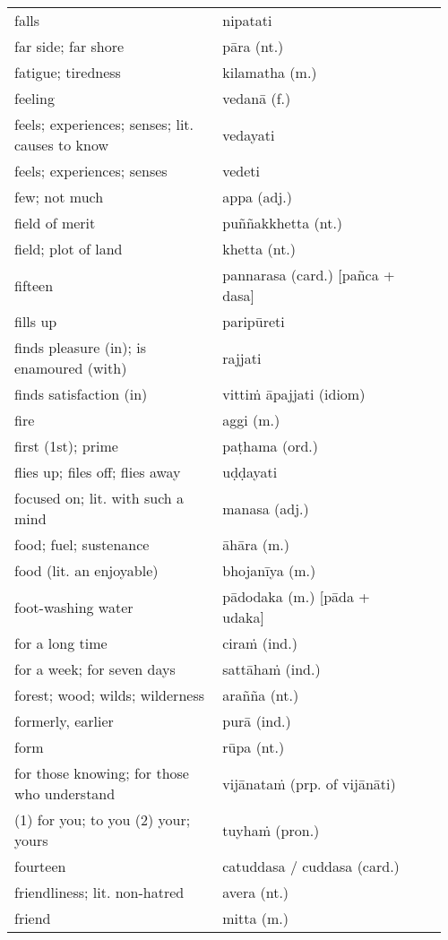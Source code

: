 \documentclass[a5paper]{memoir}
\begin{document}
\begin{longtable}{L{0.48\linewidth} L{0.48\linewidth} H}
falls & nipatati & \\[0pt]
far side; far shore & pāra (nt.) & \\[0pt]
fatigue; tiredness & kilamatha (m.) & \\[0pt]
feeling & vedanā (f.) & \\[0pt]
feels; experiences; senses; lit. causes to know & vedayati & \\[0pt]
feels; experiences; senses & vedeti & \\[0pt]
few; not much & appa (adj.) & \\[0pt]
field of merit & puññakkhetta (nt.) & \\[0pt]
field; plot of land & khetta (nt.) & \\[0pt]
fifteen & pannarasa (card.) [pañca + dasa] & \\[0pt]
fills up & paripūreti & \\[0pt]
finds pleasure (in); is enamoured (with) & rajjati & \\[0pt]
finds satisfaction (in) & vittiṁ āpajjati (idiom) & \\[0pt]
fire & aggi (m.) & \\[0pt]
first (1st); prime & paṭhama (ord.) & \\[0pt]
flies up; files off; flies away & uḍḍayati & \\[0pt]
focused on; lit. with such a mind & manasa (adj.) & \\[0pt]
food; fuel; sustenance & āhāra (m.) & \\[0pt]
food (lit. an enjoyable) & bhojanīya (m.) & \\[0pt]
foot-washing water & pādodaka (m.) [pāda + udaka] & \\[0pt]
for a long time & ciraṁ (ind.) & \\[0pt]
for a week; for seven days & sattāhaṁ (ind.) & \\[0pt]
forest; wood; wilds; wilderness & arañña (nt.) & \\[0pt]
formerly, earlier & purā (ind.) & \\[0pt]
form & rūpa (nt.) & \\[0pt]
for those knowing; for those who understand & vijānataṁ (prp. of vijānāti) & \\[0pt]
(1) for you; to you (2) your; yours & tuyhaṁ (pron.) & \\[0pt]
fourteen & catuddasa / cuddasa (card.) & \\[0pt]
friendliness; lit. non-hatred & avera (nt.) & \\[0pt]
friend & mitta (m.) & \\[0pt]

\end{longtable}
\end{document}
